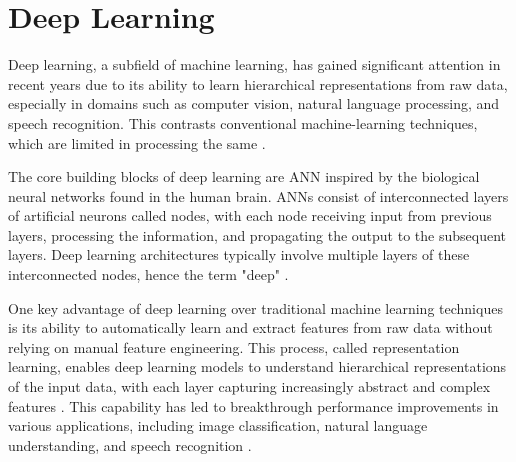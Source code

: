 \section{Deep Learning} 
Deep learning, a subfield of machine learning, has gained significant attention in recent years due to its ability to learn hierarchical representations from raw data, especially in domains such as computer vision, natural language processing, and speech recognition. This contrasts conventional machine-learning techniques, which are limited in processing the same \autocite{lecun2015deep}. 

The core building blocks of deep learning are \Gls{ANN} inspired by the biological neural networks found in the human brain. ANNs consist of interconnected layers of artificial neurons called nodes, with each node receiving input from previous layers, processing the information, and propagating the output to the subsequent layers. Deep learning architectures typically involve multiple layers of these interconnected nodes, hence the term "deep" \autocite{goodfellow2016deep}.

One key advantage of deep learning over traditional machine learning techniques is its ability to automatically learn and extract features from raw data without relying on manual feature engineering. This process, called representation learning, enables deep learning models to understand hierarchical representations of the input data, with each layer capturing increasingly abstract and complex features \autocite{bengio2013representation}. This capability has led to breakthrough performance improvements in various applications, including image classification, natural language understanding, and speech recognition \autocite{krizhevsky2017imagenet}.
